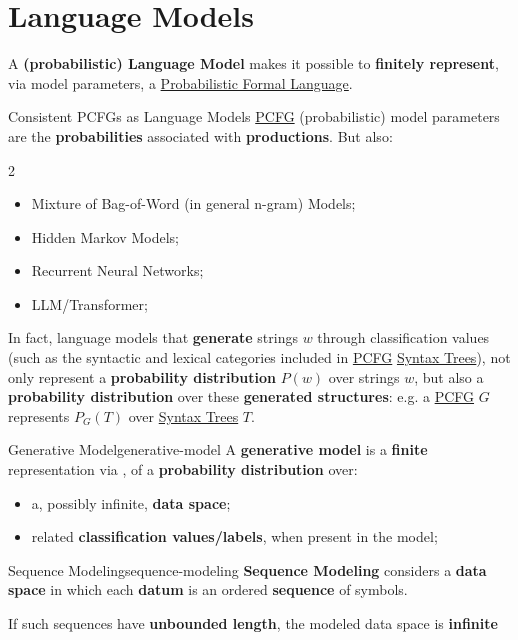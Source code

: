 \section{Language Models}\label{sec:lm_language_models} %
A \textbf{(probabilistic) Language Model} makes it possible to \textbf{finitely represent}, via model parameters, a \hyperref[def:pfl]{Probabilistic Formal Language}.
\begin{example}{Consistent PCFGs as Language Models}{}
    \hyperref[def:pcfg]{PCFG} (probabilistic) model parameters are the \textbf{probabilities} associated with \textbf{productions}.
    But also:
    \begin{multicols}{2}
        \begin{itemize}
            \item Mixture of Bag-of-Word (in general n-gram) Models;
            \item Hidden Markov Models;
            \item Recurrent Neural Networks;
            \item LLM/Transformer;
        \end{itemize}
    \end{multicols}
\end{example}
In fact, language models that \textbf{generate} strings $w$ through classification values (such as the syntactic and lexical categories included in \hyperref[def:pcfg]{PCFG} \hyperref[def:pg-syntax-tree]{Syntax Trees}), not only represent a \textbf{probability distribution} $P(w)$ over strings $w$, but also a \textbf{probability distribution} over these \textbf{generated structures}: e.g. a \hyperref[def:pcfg]{PCFG} $G$ represents $P_G(T)$ over \hyperref[def:pg-syntax-tree]{Syntax Trees} $T$.
\begin{definition}{Generative Model}{generative-model}
    A \textbf{generative model} is a \textbf{finite} representation via , of a \textbf{probability distribution} over:
    \begin{itemize}
        \item a, possibly infinite, \textbf{data space};
        \item related \textbf{classification values/labels}, when present in the model;
    \end{itemize}
    \begin{definition}{Sequence Modeling}{sequence-modeling}
        \textbf{Sequence Modeling} considers a \textbf{data space} in which each \textbf{datum} is an ordered \textbf{sequence} of symbols.
        \begin{note}
            If such sequences have \textbf{unbounded length}, the modeled data space is \textbf{infinite}
        \end{note}
    \end{definition}
\end{definition}
